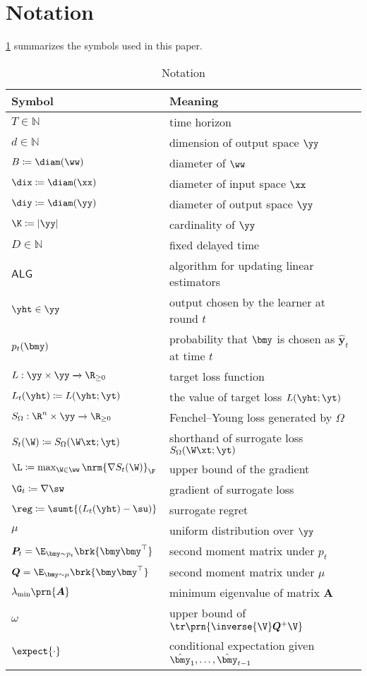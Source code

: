 \section{Notation}
\label{app: notation}
\cref{tab: notation} summarizes the symbols used in this paper.
\begin{table}[H]
\centering
\caption{Notation}
\renewcommand{\arraystretch}{1.2} 
\begin{tabular}{ll}
\toprule
Symbol & Meaning \\ 
\midrule
$T \in \mathbb{N}$ & time horizon \\
$d \in \mathbb{N}$ & dimension of output space $\yy$ \\
$B\coloneqq\diam(\ww)$ & diameter of $\ww$\\
$\dix\coloneqq\diam(\xx)$ & diameter of input space $\xx$\\
$\diy\coloneqq\diam(\yy)$ & diameter of output space $\yy$\\
$\K\coloneqq|\yy|$ & cardinality of $\yy$\\
$D\in\mathbb{N}$ & fixed delayed time\\
$\mathsf{ALG}$ & algorithm for updating linear estimators \\
$\yht \in\yy$ & output chosen by the learner at round $t$ \\
$p_t(\bmy)$ & probability that $\bmy$ is chosen as $\hat{\bm{y}}_t$ at time $t$ \\
\midrule
$L:\yy\times\yy\xrightarrow{}\R_{\geq0}$ & target loss function\\ 
$L_t(\yht)\coloneqq L(\yht;\yt)$& the value of target loss $L(\yht;\yt)$\\
$S_\Omega:\R^n\times\yy\xrightarrow{}\R_{\geq0}$ & Fenchel--Young loss generated by $\Omega$\\
$S_t(\W)\coloneqq S_\Omega(\W\xt;\yt)$& shorthand of surrogate loss $S_\Omega(\W\xt;\yt)$\\
$\L\coloneqq\max_{\W\in\ww}\nrm{\nabla S_t(\W)}_{\F}$ & upper bound of the gradient \\
$\G_t\coloneqq\nabla\sw$& gradient of surrogate loss\\
$\reg\coloneqq\sumt{(L_t(\yht)-\su)}$ & surrogate regret\\
\midrule
$\mu$ &  uniform distribution over $\yy$ \\
$\bm{P}_t=\E_{\bmy\sim p_t}\brk{\bmy\bmy^\top}$ & second moment matrix under $p_t$\\
$\bm{Q}=\E_{\bmy\sim\mu}\brk{\bmy\bmy^\top}$ & second moment matrix under $\mu$\\
$\lambda_{\min}\prn{\bm{A}}$ & minimum eigenvalue of matrix $\bm{A}$\\
$\omega $ & upper bound of $\tr\prn{\inverse{\V}\bm{Q}^+\V}$\\
$\expect{\cdot}$ & conditional expectation given $\hat{\bmy}_1, \dots, \hat{\bmy}_{t-1}$\\
\bottomrule
\end{tabular}
\label{tab: notation}
\end{table}
